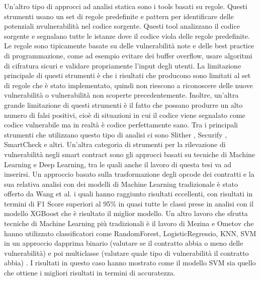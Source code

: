 \documentclass[../../Thesis.tex]{subfiles}
\begin{document}
Un'altro tipo di approcci ad analisi statica sono i tools basati su regole. Questi strumenti usano un set di regole predefinite e pattern per identificare delle potenziali nvulnerabilità nel codice sorgente. Questi tool analizzano il codice sorgente e segnalano tutte le istanze dove il codice viola delle regole predefinite. Le regole sono tipicamente basate su delle vulnerabilità note e delle best practice di programmazione, come ad esempio evitare dei buffer overflow, usare algoritmi di cifratura sicuri e validare propriamente l'input degli utenti. La limitazione principale di questi strumenti è che i risultati che producono sono limitati al set di regole che è stato implementato, quindi non riescono a riconoscere delle nuove vulnerabilità o vulnerabilità non scoperte precedentemente. Inoltre, un'altra grande limitazione di questi strumenti è il fatto che possano produrre un alto numero di falsi positivi, cioè di situazioni in cui il codice viene segnalato come codice vulnerabile ma in realtà è codice perfettamente sano. Tra i principali strumenti che utilizzano questo tipo di analisi ci sono Slither \cite{Slither}, Securify \cite{Securify}, SmartCheck \cite{SmartCheck} e altri.
Un'altra categoria di strumenti per la rilevazione di vulnerabilità negli smart contract sono gli approcci basati su tecniche di Machine Learning e Deep Learning, tra le quali anche il lavoro di questa tesi va ad inserirsi. Un approccio basato sulla trasformazione degli opcode dei contratti e la sua relativa analisi con dei modelli di Machine Learning tradizionale è stato offerto da Wang et al. \cite{ContractWard} i quali hanno raggiunto risultati eccellenti, con risultati in termini di F1 Score superiori al 95\% in quasi tutte le classi prese in analisi con il modello XGBoost che è risultato il miglior modello. Un altro lavoro che sfrutta tecniche di Machine Learning più tradizionali è il lavoro di Mezina e Ometov che hanno utilizzato classificatori come RandomForest, LogisticRegressio, KNN, SVM in un approccio dapprima binario (valutare se il contratto abbia o meno delle vulnerabilità) e poi multiclasse (valutare quale tipo di vulnerabilità il contratto abbia) \cite{Mezina}. I risultati in questo caso hanno mostrato come il modello SVM sia quello che ottiene i migliori risultati in termini di accuratezza. 
\end{document}
